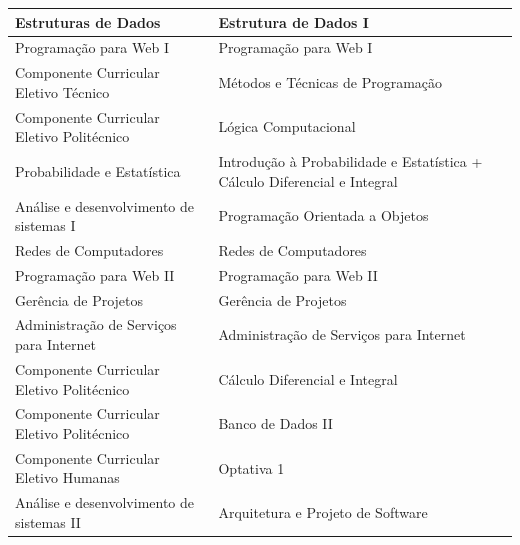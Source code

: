 \documentclass[11pt,fleqn]{book} %
\begin{document}
\begin{table}[]
{\begin{tabular}{|l|l|}
				Estruturas de Dados                       & Estrutura de Dados I                                                                             \\ \hline
				Programação para Web I                    & Programação para Web I                                                                           \\ \hline
				Componente Curricular Eletivo Técnico     & Métodos e Técnicas de Programação                                                                \\ \hline
				Componente Curricular Eletivo Politécnico & Lógica Computacional                                                                             \\ \hline
				Probabilidade e Estatística               & Introdução à Probabilidade e Estatística + Cálculo Diferencial e Integral                        \\ \hline
				Análise e desenvolvimento de sistemas I   & Programação Orientada a Objetos                                                                  \\ \hline
				Redes de Computadores                     & Redes de Computadores                                                                            \\ \hline
				Programação para Web II                   & Programação para Web II                                                                          \\ \hline
				Gerência de Projetos                      & Gerência de Projetos                                                                             \\ \hline
				Administração de Serviços para Internet   & Administração de Serviços para Internet                                                          \\ \hline
				Componente Curricular Eletivo Politécnico & Cálculo Diferencial e Integral                                                                   \\ \hline
				Componente Curricular Eletivo Politécnico & Banco de Dados II                                                                                \\ \hline
				Componente Curricular Eletivo Humanas     & Optativa 1                                                                                       \\ \hline
				Análise e desenvolvimento de sistemas II  & Arquitetura e Projeto de Software                                                                \\ \hline

\end{tabular}}
\end{table}
\end{document}
